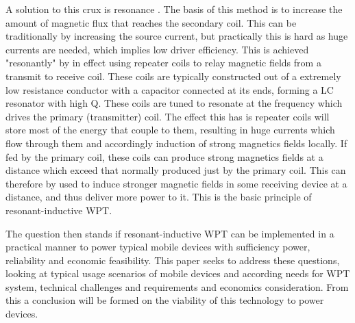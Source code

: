 \documentclass[11pt,letterpaper]{article}
\begin{document}
\noindent A solution to this crux is resonance \cite{duong}. The basis of this method is to increase the amount of magnetic flux that reaches the secondary coil. This can be traditionally by increasing the source current, but practically this is hard as huge currents are needed, which implies low driver efficiency. This is achieved "resonantly" by in effect using repeater coils to relay magnetic fields from a transmit to receive coil. These coils are typically constructed out of a extremely low resistance conductor with a capacitor connected at its ends, forming a LC resonator with high Q. These coils are tuned to resonate at the frequency which drives the primary (transmitter) coil. The effect this has is repeater coils will store most of the energy that couple to them, resulting in huge currents which flow through them and accordingly induction of strong magnetics fields locally. If fed by the primary coil, these coils can produce strong magnetics fields at a distance which exceed that normally produced just by the primary coil. This can therefore by used to induce stronger magnetic fields in some receiving device at a distance, and thus deliver more power to it. This is the basic principle of resonant-inductive WPT.\\\par 
\noindent The question then stands if resonant-inductive WPT can be implemented in a practical manner to power typical mobile devices with sufficiency power, reliability and economic feasibility. This paper seeks to address these questions, looking at typical usage scenarios of mobile devices and according needs for WPT system, technical challenges and requirements and economics consideration. From this a conclusion will be formed on the viability of this technology to power devices.
\end{document}
